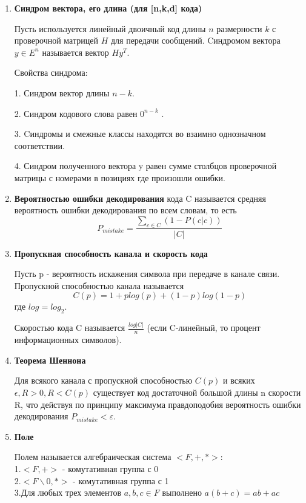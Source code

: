 \documentclass[a4paper, 12pt]{report}
\begin{document}
\begin{enumerate}

\item \textbf{Синдром вектора, его длина (для [n,k,d] кода)}

Пусть используется линейный двоичный код длины $n$ размерности $k$ с проверочной матрицей $H$ для передачи сообщений. Cиндромом вектора $y \in E^n$  называется вектор $H y^T$.

Свойства синдрома:


1. Синдром вектор длины $n - k$.

2. Синдром кодового слова равен $0^{n - k}$ .

3. Cиндромы и смежные классы находятся во взаимно однозначном соответствии.

4. Синдром полученного вектора y равен сумме столбцов проверочной матрицы с номерами в позициях где произошли ошибки.


\item \textbf{Вероятностью ошибки декодирования} кода C называется
средняя вероятность ошибки декодирования по всем словам, то
есть
\[ P_{mistake} = \frac{\sum_{c \in C} (1 - P(c|c)) }{|C|}  \]

\item \textbf{Пропускная способность канала и скорость кода}

Пусть p - вероятность искажения символа при передаче в канале
связи.
Пропускной способностью канала называется
\[C(p) = 1 + p log(p) + (1 - p) log(1 - p)\] где $log = log_2$.

Скоростью кода C называется $\frac{log |C|}{n}$
(если C-линейный, то процент информационных символов).


\item \textbf{Теорема Шеннона}

Для всякого канала с пропускной способностью $C(p)$ и всяких $\epsilon, R > 0, R < C(p)$ существует код достаточной большой длины n скорости R, что действуя по принципу максимума правдоподобия вероятность ошибки декодирования $P_{mistake} < \varepsilon$.

\item \textbf{Поле}

Полем называется алгебраическая система $<F, +, *>:$\\
1.$<F,+>$ - комутативная группа с 0\\
2.$<F\backslash0,*>$ - комутативная группа с 1\\
3.Для любых трех элементов $a,b,c \in F$ выполнено $a(b+c) = ab + ac$


\end{enumerate}
\end{document}
